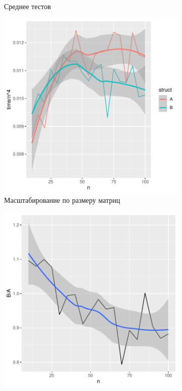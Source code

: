 \documentclass[specialist, substylefile = spbureport.rtx,
               subf,href,colorlinks=true, 12pt]{disser}
\begin{document}
\begin{figure}[h]
\begin{minipage}[t]{\columnwidth}
\begin{subfigure}[t]{0.475\linewidth}
            \caption{Среднее тестов}
        \end{subfigure}
        \end{minipage}%
        \hfill
        \begin{minipage}[t]{\columnwidth}%
        \begin{subfigure}[t]{0.475\linewidth}%
            \includegraphics[width=\linewidth]{line_smooth_norm.pdf}
            \caption{Масштабирование по размеру матриц}
        \end{subfigure}%
        \hfill
        \begin{subfigure}[t]{0.475\linewidth}%
            \includegraphics[width=\linewidth]{relation.pdf} 

\end{subfigure}
\end{minipage}
\end{figure}
\end{document}
